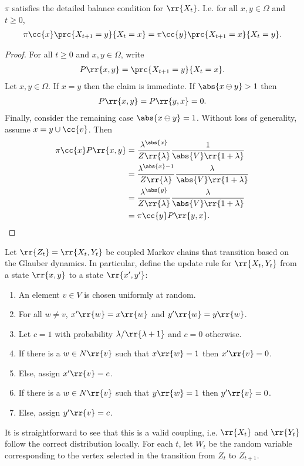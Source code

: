 \documentclass{article}
\begin{document}
\begin{claim*}[2]
  $\pi$ satisfies the detailed balance condition for $\rr{X_t}$.
  I.e. for all $x,y\in\Omega$ and $t\geq 0$,
  \begin{align*}
    \pi\cc{x}\prc{X_{t+1}=y}{X_t=x}=\pi\cc{y}\prc{X_{t+1}=x}{X_t=y}.
  \end{align*}
  \begin{proof}
    For all $t\geq 0$ and $x,y\in\Omega$, write
    \begin{align*}
      P\rr{x,y}=\prc{X_{t+1}=y}{X_t=x}.
    \end{align*}
    Let $x,y\in\Omega$. If $x=y$ then the claim is immediate. If $\abs{x\ominus y}>1$ then
    \begin{align*}
      P\rr{x,y}=P\rr{y,x}=0.
    \end{align*}
    Finally, consider the remaining case $\abs{x\ominus y}=1$. Without loss of generality, assume $x=y\cup\cc{v}$. Then
    \begin{align*}
      \pi\cc{x}P\rr{x,y}
      &={\frac{\lambda^{\abs{x}}}{Z\rr{\lambda}}}{\frac{1}{\abs{V}\rr{1+\lambda}}} \\
      &={\frac{\lambda^{\abs{x}-1}}{Z\rr{\lambda}}}{\frac{\lambda}{\abs{V}\rr{1+\lambda}}} \\
      &={\frac{\lambda^{\abs{y}}}{Z\rr{\lambda}}}{\frac{\lambda}{\abs{V}\rr{1+\lambda}}} \\
      &=\pi\cc{y}P\rr{y,x}.
    \end{align*}
  \end{proof}
\end{claim*}

Let $\rr{Z_t}=\rr{X_t,Y_t}$ be coupled Markov chains that transition
based on the Glauber dynamics. In particular, define the update rule for $\rr{X_t,Y_t}$
from a state $\rr{x,y}$ to a state $\rr{x',y'}$:
\begin{enumerate}
  \item An element $v\in V$ is chosen uniformly at random.
  \item For all $w\neq v$, $x'\rr{w}=x\rr{w}$ and $y'\rr{w}=y\rr{w}$.
  \item Let $c=1$ with probability $\lambda/\rr{\lambda+1}$ and $c=0$ otherwise.
  \item If there is a $w\in N\rr{v}$ such that $x\rr{w}=1$ then $x'\rr{v}=0$.
  \item Else, assign $x'\rr{v}=c$.
  \item If there is a $w\in N\rr{v}$ such that $y\rr{w}=1$ then $y'\rr{v}=0$.
  \item Else, assign $y'\rr{v}=c$.
\end{enumerate}
It is straightforward to see that this is a valid coupling, i.e. $\rr{X_t}$ and $\rr{Y_t}$
follow the correct distribution locally. For each $t$, let $W_t$ be the random variable
corresponding to the vertex selected in the transition from $Z_t$ to $Z_{t+1}$.
\end{document}
